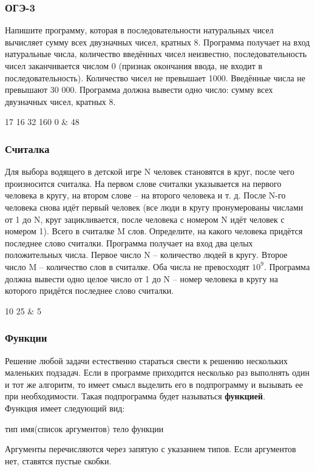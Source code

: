 \begin{frame}
	\frametitle{ОГЭ-3}
	Напишите программу, которая в последовательности натуральных чисел вычисляет
	сумму всех двузначных чисел, кратных 8.
	\inp
	Программа получает на вход натуральные числа, количество введённых чисел
	неизвестно, последовательность чисел заканчивается числом 0 (признак
	окончания ввода, не входит в последовательность). Количество чисел не
	превышает 1000. Введённые числа не превышают 30 000.
	\out
	Программа должна вывести одно число: сумму всех двузначных чисел, кратных 8.
	\begin{ex}
	17 16 32 160 0 & 48 \tb
	\end{ex}
\end{frame}

\begin{frame}
	\frametitle{Считалка}
	Для выбора водящего в детской игре N человек становятся в круг, после чего
	произносится считалка. На первом слове считалки указывается на первого
	человека в кругу, на втором слове -- на второго человека и т. д. После N-го
	человека снова идёт первый человек (все люди в кругу пронумерованы числами от
	1 до N, круг зацикливается, после человека с номером N идёт человек с номером
	1). Всего в считалке M слов. Определите, на какого человека придётся
	последнее слово считалки.
	\inp
	Программа получает на вход два целых положительных числа. Первое число N –
	количество людей в кругу. Второе число M -- количество слов в считалке. Оба
	числа не превосходят $10^9$.
	\out
	Программа должна вывести одно целое число от 1 до N -- номер человека в кругу
	на которого придётся последнее слово считалки.
	\begin{ex}
	10 25 & 5 \tb
	\end{ex}
\end{frame}

\begin{frame}[fragile]
	\frametitle{Функции}
	Решение любой задачи естественно стараться свести к решению нескольких
	маленьких подзадач. Если в программе приходится несколько раз выполнять один и
	тот же алгоритм, то имеет смысл выделить его в подпрограмму и вызывать ее при
	необходимости. Такая подпрограмма будет называться {\bf функцией}. \\

	Функция имеет следующий вид:
	\begin{code}
тип имя(список аргументов)
{
	тело функции
}
	\end{code}

	Аргументы перечисляются через запятую с указанием типов. Если аргументов нет,
	ставятся пустые скобки.
\end{frame}

